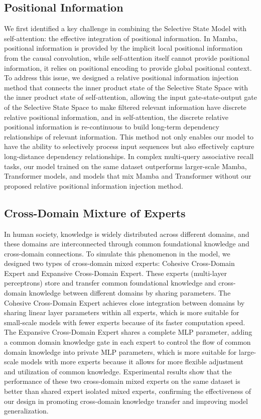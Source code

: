 \documentclass{article}
\theoremstyle{plain}
\theoremstyle{definition}
\theoremstyle{remark}
\begin{document}
\subsection{Positional Information}

We first identified a key challenge in combining the Selective State Model with self-attention: the effective integration of positional information. In Mamba, positional information is provided by the implicit local positional information from the causal convolution, while self-attention itself cannot provide positional information, it relies on positional encoding to provide global positional context. To address this issue, we designed a relative positional information injection method that connects the inner product state of the Selective State Space with the inner product state of self-attention, allowing the input gate-state-output gate of the Selective State Space to make filtered relevant information have discrete relative positional information, and in self-attention, the discrete relative positional information is re-continuous to build long-term dependency relationships of relevant information. This method not only enables our model to have the ability to selectively process input sequences but also effectively capture long-distance dependency relationships. In complex multi-query associative recall tasks, our model trained on the same dataset outperforms larger-scale Mamba, Transformer models, and models that mix Mamba and Transformer without our proposed relative positional information injection method.

\subsection{Cross-Domain Mixture of Experts}
In human society, knowledge is widely distributed across different domains, and these domains are interconnected through common foundational knowledge and cross-domain connections. To simulate this phenomenon in the model, we designed two types of cross-domain mixed experts: Cohesive Cross-Domain Expert and Expansive Cross-Domain Expert. These experts (multi-layer perceptrons) store and transfer common foundational knowledge and cross-domain knowledge between different domains by sharing parameters. The Cohesive Cross-Domain Expert achieves close integration between domains by sharing linear layer parameters within all experts, which is more suitable for small-scale models with fewer experts because of its faster computation speed. The Expansive Cross-Domain Expert shares a complete MLP parameter, adding a common domain knowledge gate in each expert to control the flow of common domain knowledge into private MLP parameters, which is more suitable for large-scale models with more experts because it allows for more flexible adjustment and utilization of common knowledge. Experimental results show that the performance of these two cross-domain mixed experts on the same dataset is better than shared expert isolated mixed experts, confirming the effectiveness of our design in promoting cross-domain knowledge transfer and improving model generalization.
\end{document}
